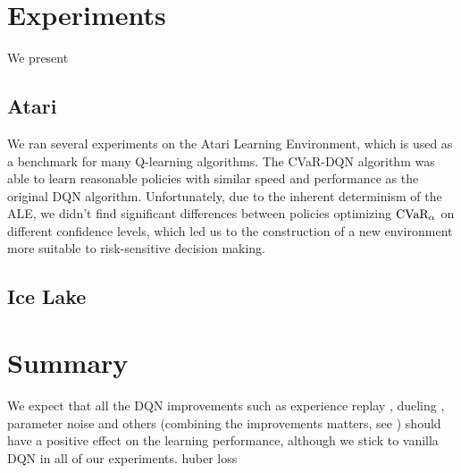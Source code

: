 

\section{Experiments}
We present 

\subsection{Atari}
We ran several experiments on the Atari Learning Environment, which is used as a benchmark for many Q-learning algorithms. The CVaR-DQN algorithm was able to learn reasonable policies with similar speed and performance as the original DQN algorithm. Unfortunately, due to the inherent determinism of the ALE, we didn't find significant differences between policies optimizing $\text{CVaR}_\alpha$ on different confidence levels, which led us to the construction of a new environment more suitable to risk-sensitive decision making.

\subsection{Ice Lake}



\section{Summary}
We expect that all the DQN improvements such as experience replay \cite{...}, dueling \cite{...}, parameter noise \cite{...} and others (combining the improvements matters, see \cite{...}) should have a positive effect on the learning performance, although we stick to vanilla DQN in all of our experiments. huber loss

